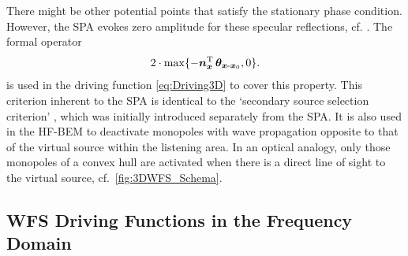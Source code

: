 There might be other potential points that satisfy the stationary phase
condition.
However, the SPA evokes zero amplitude for these specular reflections, cf.
\cite{ZotterSchultz2020_White}.  %
The formal operator
\begin{align}
\label{eq:SecSrcSel}
2\cdot\mathrm{max}\{-\bm{n}^\mathrm{T}_{\bm{x}} \, \bm{\theta}_{\bm{x}\text{-}\bm{x}_\mathrm{0}}, 0\}.
\end{align}
is used in the driving function \eqref{eq:Driving3D} to cover this property.
This criterion inherent to the SPA is identical to the
`secondary source selection criterion'
\cite{Nicol1999, Spors2007b, Spors2008a}, which was initially introduced
separately from the SPA.
%
It is also used in the HF-BEM to deactivate monopoles with wave propagation
opposite to that of the virtual source within the listening area.
%
In an optical analogy, only those monopoles of a convex hull are activated when
there is a direct line of sight to the virtual source,
cf.~\myfig\ref{fig:3DWFS_Schema}.



\subsection{WFS Driving Functions in the Frequency Domain}

